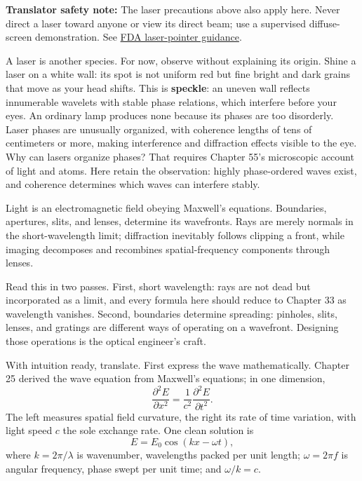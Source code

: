 \textbf{Translator safety note:} The laser precautions above also apply here. Never direct a laser toward anyone or view its direct beam; use a supervised diffuse-screen demonstration. See \href{https://www.fda.gov/radiation-emitting-products/alerts-and-notices/illuminating-facts-about-laser-pointers}{FDA laser-pointer guidance}.

A laser is another species. For now, observe without explaining its origin. Shine a laser on a white wall: its spot is not uniform red but fine bright and dark grains that move as your head shifts. This is \textbf{speckle}: an uneven wall reflects innumerable wavelets with stable phase relations, which interfere before your eyes. An ordinary lamp produces none because its phases are too disorderly. Laser phases are unusually organized, with coherence lengths of tens of centimeters or more, making interference and diffraction effects visible to the eye. Why can lasers organize phases? That requires Chapter 55's microscopic account of light and atoms. Here retain the observation: highly phase-ordered waves exist, and coherence determines which waves can interfere stably.


\begin{oneline}
Light is an electromagnetic field obeying Maxwell's equations. Boundaries, apertures, slits, and lenses, determine its wavefronts. Rays are merely normals in the short-wavelength limit; diffraction inevitably follows clipping a front, while imaging decomposes and recombines spatial-frequency components through lenses.
\end{oneline}

Read this in two passes. First, short wavelength: rays are not dead but incorporated as a limit, and every formula here should reduce to Chapter 33 as wavelength vanishes. Second, boundaries determine spreading: pinholes, slits, lenses, and gratings are different ways of operating on a wavefront. Designing those operations is the optical engineer's craft.


With intuition ready, translate. First express the wave mathematically. Chapter 25 derived the wave equation from Maxwell's equations; in one dimension,
\[
  \frac{\partial^2 E}{\partial x^2}=\frac{1}{c^2}\frac{\partial^2 E}{\partial t^2}.
\]
The left measures spatial field curvature, the right its rate of time variation, with light speed \(c\) the sole exchange rate. One clean solution is
\[
  E=E_0\cos(kx-\omega t),
\]
where \(k=2\pi/\lambda\) is wavenumber, wavelengths packed per unit length; \(\omega=2\pi f\) is angular frequency, phase swept per unit time; and \(\omega/k=c\).

